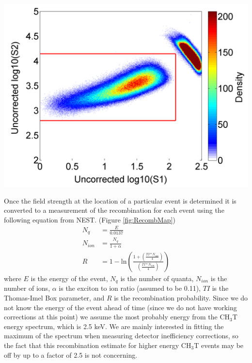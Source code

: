 \documentclass[a4paper,12pt]{article}
\begin{document}
{\begin{center}
\includegraphics[scale=0.6]{Run04Corrections/TritiumDetectorInefficiency_Cuts.png}
 \label{fig:TritBoxCut}
\end{center}


Once the field strength at the location of a particular event is determined it is converted to a measurement of the recombination for each event using the following equation from NEST. (Figure \ref{fig:RecombMap}) 
\begin{align}
N_q &= \frac{E}{0.0137} \label{NqEq} \\
N_{ion} &= \frac{N_q}{1+\alpha} \label{NionEq} \\
R &= 1-\mbox{ln} \left( \frac{1+(\frac{TI*N_{ion}}{4})}{(\frac{TI*N_{ion}}{4})} \right)
\end{align}
where $E$ is the energy of the event, $N_q$ is the number of quanta, $N_{ion}$ is the number of ions, $\alpha$ is the exciton to ion ratio (assumed to be 0.11), $TI$ is the Thomas-Imel Box parameter, and $R$ is the recombination probability.  Since we do not know the energy of the event ahead of time (since we do not have working corrections at this point) we assume the most probably energy from the CH$_3$T energy spectrum, which is 2.5 keV.  We are mainly interested in fitting the maximum of the spectrum when measuring detector inefficiency corrections, so the fact that this recombination estimate for higher energy CH$_3$T events may be off by up to a factor of 2.5 is not concerning.  

}
\end{document}
